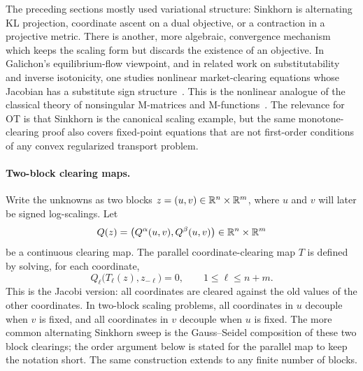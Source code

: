 The preceding sections mostly used variational structure: Sinkhorn is alternating KL projection, coordinate ascent on a dual objective, or a contraction in a projective metric.  There is another, more algebraic, convergence mechanism which keeps the scaling form but discards the existence of an objective.  In Galichon's equilibrium-flow viewpoint, and in related work on substitutability and inverse isotonicity, one studies nonlinear market-clearing equations whose Jacobian has a substitute sign structure~\cite{GalichonJacquet2024Substitutability,GalichonSamuelsonVernet2022Monotone}.  This is the nonlinear analogue of the classical theory of nonsingular M-matrices and M-functions~\cite{MoreRheinboldt1973PSFunctions,Plemmons1977MMatrix}.  The relevance for OT is that Sinkhorn is the canonical scaling example, but the same monotone-clearing proof also covers fixed-point equations that are not first-order conditions of any convex regularized transport problem.

\paragraph{Two-block clearing maps.}
Write the unknowns as two blocks \(z=(u,v)\in\mathbb{R}^n\times\mathbb{R}^m\), where \(u\) and \(v\) will later be signed log-scalings.  Let
\[
	Q(z)=\big(Q^\alpha(u,v),Q^\beta(u,v)\big)
	\in\mathbb{R}^n\times\mathbb{R}^m
\]
be a continuous clearing map.  The parallel coordinate-clearing map \(T\) is defined by solving, for each coordinate,
\[
	Q_\ell\big(T_\ell(z),z_{-\ell}\big)=0,
	\qquad 1\leq \ell\leq n+m.
\]
This is the Jacobi version: all coordinates are cleared against the old values of the other coordinates.  In two-block scaling problems, all coordinates in \(u\) decouple when \(v\) is fixed, and all coordinates in \(v\) decouple when \(u\) is fixed.  The more common alternating Sinkhorn sweep is the Gauss--Seidel composition of these two block clearings; the order argument below is stated for the parallel map to keep the notation short.  The same construction extends to any finite number of blocks.

